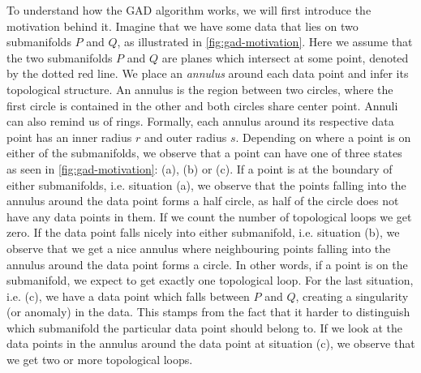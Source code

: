 To understand how the GAD algorithm works, we will first introduce the motivation behind it. Imagine that we have some data that lies on two submanifolds $P$ and $Q$, as illustrated in \cref{fig:gad-motivation}. Here we assume that the two submanifolds $P$ and $Q$ are planes which intersect at some point, denoted by the dotted red line. We place an \textit{annulus} around each data point and infer its topological structure. An annulus is the region between two circles, where the first circle is contained in the other and both circles share center point. Annuli can also remind us of rings. Formally, each annulus around its respective data point has an inner radius $r$ and outer radius $s$. Depending on where a point is on either of the submanifolds, we observe that a point can have one of three states as seen in \cref{fig:gad-motivation}: (a), (b) or (c). If a point is at the boundary of either submanifolds, i.e. situation (a), we observe that the points falling into the annulus around the data point forms a half circle, as half of the circle does not have any data points in them. If we count the number of topological loops we get zero. If the data point falls nicely into either submanifold, i.e. situation (b), we observe that we get a nice annulus where neighbouring points falling into the annulus around the data point forms a circle. In other words, if a point is on the submanifold, we expect to get exactly one topological loop. For the last situation, i.e. (c), we have a data point which falls between $P$ and $Q$, creating a singularity (or anomaly) in the data. This stamps from the fact that it harder to distinguish which submanifold the particular data point should belong to. If we look at the data points in the annulus around the data point at situation (c), we observe that we get two or more topological loops.
